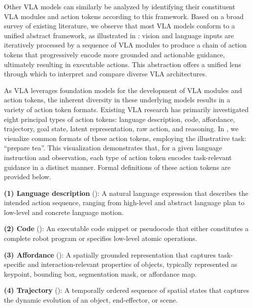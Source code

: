 \documentclass[10pt, a4paper, logo, copyright]{googledeepmind} %
\begin{document}
Other VLA models can similarly be analyzed by identifying their constituent VLA modules and action tokens according to this framework. Based on a broad survey of existing literature, we observe that most VLA models conform to a unified abstract framework, as illustrated in : vision and language inputs are iteratively processed by a sequence of VLA modules to produce a chain of action tokens that progressively encode more grounded and actionable guidance, ultimately resulting in executable actions. This abstraction offers a unified lens through which to interpret and compare diverse VLA architectures.



As VLA leverages foundation models for the development of VLA modules and action tokens, the inherent diversity in these underlying models results in a variety of action token formats. Existing VLA research has primarily investigated eight principal types of action tokens: language description, code, affordance, trajectory, goal state, latent representation, raw action, and reasoning. In , we visualize common formats of these action tokens, employing the illustrative task: ``prepare tea''. This visualization demonstrates that, for a given language instruction and observation, each type of action token encodes task-relevant guidance in a distinct manner. Formal definitions of these action tokens are provided below.

\vspace{0.5em}
\noindent\textbf{(1) Language description} (): A natural language expression that describes the intended action sequence, ranging from high-level and abstract language plan to low-level and concrete language motion.

\noindent\textbf{(2) Code} (): An executable code snippet or pseudocode that either constitutes a complete robot program or specifies low-level atomic operations.

\noindent\textbf{(3) Affordance} (): A spatially grounded representation that captures task-specific and interaction-relevant properties of objects, typically represented as keypoint, bounding box, segmentation mask, or affordance map.

\noindent\textbf{(4) Trajectory} (): A temporally ordered sequence of spatial states that captures the dynamic evolution of an object, end-effector, or scene.
\end{document}
